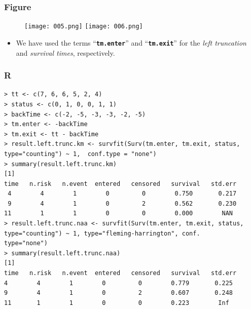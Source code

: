 \documentclass{beamer}
\newcommand{\empr}[1]{{\emph{\color{red}#1}}}
\newcommand{\pkg}[1]{{\textbf{\texttt{#1}}}}
\begin{document}
\pagebreak
\begin{frame}
\frametitle{Figure}
\begin{figure}[h!]
\texttt{[image: 005.png]}
\texttt{[image: 006.png]}
\end{figure}
\begin{itemize}
	\item We have used the terms ``\pkg{tm.enter}'' and ``\pkg{tm.exit}'' for the \empr{left truncation} and \empr{survival times}, respectively.
\end{itemize}
\end{frame}

\pagebreak
\begin{frame}[fragile]
\frametitle{R}
\begin{Verbatim}
> tt <- c(7, 6, 6, 5, 2, 4)
> status <- c(0, 1, 0, 0, 1, 1)
> backTime <- c(-2, -5, -3, -3, -2, -5)
> tm.enter <- -backTime
> tm.exit <- tt - backTime
> result.left.trunc.km <- survfit(Surv(tm.enter, tm.exit, status, 
type="counting") ~ 1,  conf.type = "none")
> summary(result.left.trunc.km) 
[1]
time   n.risk   n.event  entered   censored   survival   std.err
 4        4        1        0         0        0.750       0.217
 9        4        1        0         2        0.562       0.230
11        1        1        0         0        0.000        NAN
> result.left.trunc.naa <- survfit(Surv(tm.enter, tm.exit, status, 
type="counting") ~ 1, type="fleming-harrington", conf.
type="none")
> summary(result.left.trunc.naa)
[1]
time   n.risk   n.event  entered   censored   survival   std.err
4        4        1        0         0        0.779       0.225
9        4        1        0         2        0.607       0.248
11       1        1        0         0        0.223        Inf
\end{Verbatim}
\end{frame}
\end{document}

